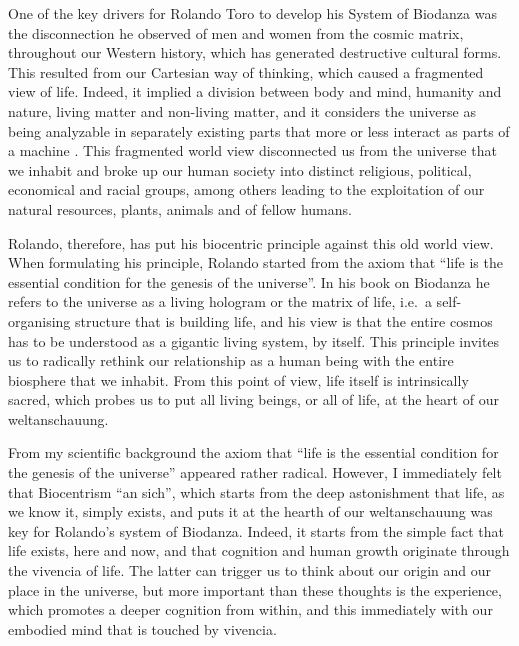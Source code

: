 \documentclass[
  11pt,
]{book}
\begin{document}
One of the key drivers for Rolando Toro to develop his System of Biodanza was the disconnection he observed of men and women from the cosmic matrix, throughout our Western history, which has generated destructive cultural forms. This resulted from our Cartesian way of thinking, which caused a fragmented view of life. Indeed, it implied a division between body and mind, humanity and nature, living matter and non-living matter, and it considers the universe as being analyzable in separately existing parts that more or less interact as parts of a machine \citep{bohm1980}. This fragmented world view disconnected us from the universe that we inhabit and broke up our human society into distinct religious, political, economical and racial groups, among others leading to the exploitation of our natural resources, plants, animals and of fellow humans.

Rolando, therefore, has put his biocentric principle against this old world view. When formulating his principle, Rolando started from the axiom that ``life is the essential condition for the genesis of the universe''. In his book on Biodanza \citep{toro2008} he refers to the universe as a living hologram or the matrix of life, i.e.~a self-organising structure that is building life, and his view is that the entire cosmos has to be understood as a gigantic living system, by itself. This principle invites us to radically rethink our relationship as a human being with the entire biosphere that we inhabit. From this point of view, life itself is intrinsically sacred, which probes us to put all living beings, or all of life, at the heart of our weltanschauung.

From my scientific background the axiom that ``life is the essential condition for the genesis of the universe'' appeared rather radical. However, I immediately felt that Biocentrism ``an sich'', which starts from the deep astonishment that life, as we know it, simply exists, and puts it at the hearth of our weltanschauung was key for Rolando's system of Biodanza. Indeed, it starts from the simple fact that life exists, here and now, and that cognition and human growth originate through the vivencia of life. The latter can trigger us to think about our origin and our place in the universe, but more important than these thoughts is the experience, which promotes a deeper cognition from within, and this immediately with our embodied mind that is touched by vivencia.
\end{document}
